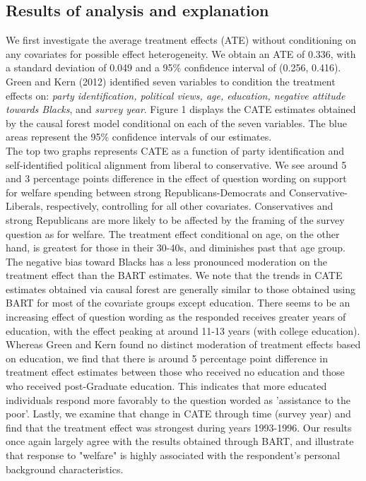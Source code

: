 \documentclass[12pt]{article}
\begin{document}
\subsection{Results of analysis and explanation}
We first investigate the average treatment effects (ATE) without conditioning on any covariates for possible effect heterogeneity. We obtain an ATE of 0.336, with a standard deviation of 0.049 and a 95\% confidence interval of (0.256, 0.416). Green and Kern (2012) identified seven variables to condition the treatment effects on: \textit{party identification, political views, age, education, negative attitude towards Blacks}, and \textit{survey year}. Figure 1 displays the CATE estimates obtained by the causal forest model conditional on each of the seven variables. The blue areas represent the 95\% confidence intervals of our estimates. \\

The top two graphs represents CATE as a function of party identification and self-identified political alignment from liberal to conservative. We see around 5 and 3 percentage points difference in the effect of question wording on support for welfare spending between strong Republicans-Democrats and Conservative-Liberals, respectively, controlling for all other covariates. Conservatives and strong Republicans are more likely to be affected by the framing of the survey question as for welfare. The treatment effect conditional on age, on the other hand, is greatest for those in their 30-40s, and diminishes past that age group. The negative bias toward Blacks has a less pronounced moderation on the treatment effect than the BART estimates.  We note that the trends in CATE estimates obtained via causal forest are generally similar to those obtained using BART for most of the covariate groups except education. There seems to be an increasing effect of question wording as the responded receives greater years of education, with the effect peaking at around 11-13 years (with college education). Whereas Green and Kern found no distinct moderation of treatment effects based on education, we find that there is around 5 percentage point difference in treatment effect estimates between those who received no education and those who received post-Graduate education. This indicates that more educated individuals respond more favorably to the question worded as 'assistance to the poor'. Lastly, we examine that change in CATE through time (survey year) and find that the treatment effect was strongest during years 1993-1996. Our results once again largely agree with the results obtained through BART, and illustrate that response to "welfare" is highly associated with the respondent's personal background characteristics. \\
\end{document}
